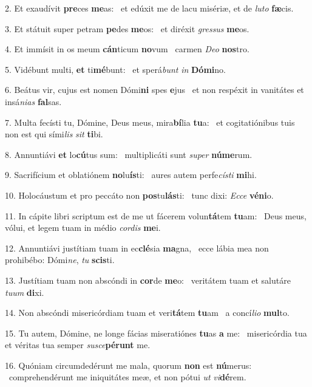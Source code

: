 2. Et exaudívit \textbf{pre}ces \textbf{me}as: \ast\  et edúxit me de lacu misériæ, et de \textit{lu}\textit{to} \textbf{fæ}cis.\

3. Et státuit super petram \textbf{pe}des \textbf{me}os: \ast\  et diréxit \textit{gres}\textit{sus} \textbf{me}os.\

4. Et immísit in os meum \textbf{cán}ticum \textbf{no}vum \ast\  carmen \textit{De}\textit{o} \textbf{nos}tro.\

5. Vidébunt multi, \textbf{et} ti\textbf{mé}bunt: \ast\  et sperá\textit{bunt} \textit{in} \textbf{Dó}\textbf{mi}no.\

6. Beátus vir, cujus est nomen Dómi\textbf{ni} spes \textbf{e}jus \ast\  et non respéxit in vanitátes et insá\textit{ni}\textit{as} \textbf{fal}sas.\

7. Multa fecísti tu, Dómine, Deus meus, mira\textbf{bí}lia \textbf{tu}a: \ast\  et cogitatiónibus tuis non est qui sími\textit{lis} \textit{sit} \textbf{ti}bi.\

8. Annuntiávi \textbf{et} lo\textbf{cú}tus sum: \ast\  multiplicáti sunt \textit{su}\textit{per} \textbf{nú}\textbf{me}rum.\

9. Sacrifícium et oblatiónem \textbf{no}lu\textbf{ís}ti: \ast\  aures autem perfe\textit{cís}\textit{ti} \textbf{mi}hi.\

10. Holocáustum et pro peccáto non \textbf{pos}tu\textbf{lás}ti: \ast\  tunc dixi: \textit{Ec}\textit{ce} \textbf{vé}\textbf{ni}o.\

11. In cápite libri scriptum est de me ut fácerem volun\textbf{tá}tem \textbf{tu}am: \ast\  Deus meus, vólui, et legem tuam in médio \textit{cor}\textit{dis} \textbf{me}i.\

12. Annuntiávi justítiam tuam in ec\textbf{clé}sia \textbf{ma}gna, \ast\  ecce lábia mea non prohibébo: Dómi\textit{ne}, \textit{tu} \textbf{scis}ti.\

13. Justítiam tuam non abscóndi in \textbf{cor}de \textbf{me}o: \ast\  veritátem tuam et salutáre \textit{tu}\textit{um} \textbf{di}xi.\

14. Non abscóndi misericórdiam tuam et veri\textbf{tá}tem \textbf{tu}am \ast\  a concí\textit{li}\textit{o} \textbf{mul}to.\

15. Tu autem, Dómine, ne longe fácias miseratiónes \textbf{tu}as \textbf{a} me: \ast\  misericórdia tua et véritas tua semper \textit{su}\textit{sce}\textbf{pé}\textbf{runt} me.\

16. Quóniam circumdedérunt me mala, quorum \textbf{non} est \textbf{nú}merus: \ast\  comprehendérunt me iniquitátes meæ, et non pótui \textit{ut} \textit{vi}\textbf{dé}rem.\

